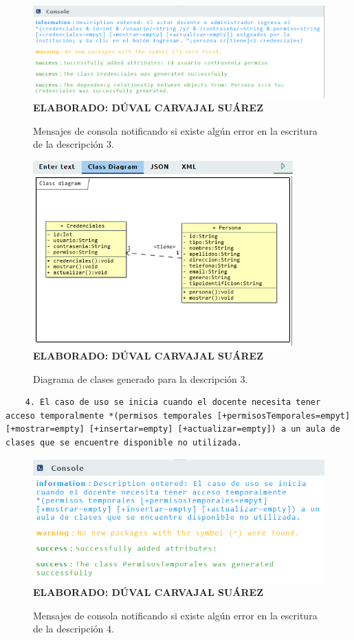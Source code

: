   \begin{figure}[h!]
 	\caption{Mensajes de consola notificando si existe algún error en la escritura de la descripción 3.}
 	\includegraphics[width=14cm]{img/not-eva-003.png}
 	\label{fig:not_eva_003}
 	\textbf{\\ ELABORADO: DÚVAL CARVAJAL SUÁREZ}
 \end{figure}
 
 \begin{figure}[H]
 	\caption{Diagrama de clases generado para la descripción 3.}
 	\includegraphics[width=10cm]{img/dc-eva-003.png}
 	\label{fig:dc_eva_003}
 	\textbf{\\ ELABORADO: DÚVAL CARVAJAL SUÁREZ}
 \end{figure}
 
  \begin{lstlisting}
 	4. El caso de uso se inicia cuando el docente necesita tener acceso temporalmente *(permisos temporales [+permisosTemporales=empyt] [+mostrar=empty] [+insertar=empty] [+actualizar=empty]) a un aula de clases que se encuentre disponible no utilizada. \end{lstlisting}
 
   \begin{figure}[h!]
 	\caption{Mensajes de consola notificando si existe algún error en la escritura de la descripción 4.}
 	\includegraphics[width=14cm]{img/not-eva-004.png}
 	\label{fig:not_eva_004}
 	\textbf{\\ ELABORADO: DÚVAL CARVAJAL SUÁREZ}
 \end{figure}
 
